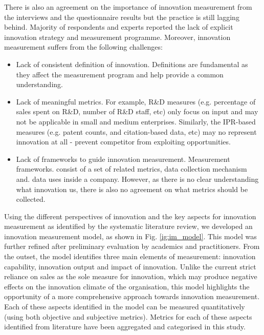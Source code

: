 \documentclass[sigplan]{acmart}
\begin{document}
There is also an agreement on the importance of innovation measurement from the interviews and the questionnaire results but the practice is still lagging behind. Majority of respondents and experts reported the lack of explicit innovation strategy and measurement programme. Moreover, innovation measurement suffers from the following challenges:
\begin{itemize}
	\item Lack of consistent definition of innovation. Definitions are fundamental as they affect the measurement program and help provide a common understanding.
	\item Lack of meaningful metrics. For example, R\&D measures (e.g. percentage of sales spent on R\&D, number of R\&D staff, etc) only focus on input and may not be applicable in small and medium enterprises. Similarly, the IPR-based measures (e.g. patent counts, and citation-based data, etc) may no represent innovation at all - prevent competitor from exploiting opportunities.
	\item Lack of frameworks to guide innovation measurement. Measurement frameworks. consist of a set of related metrics, data collection mechanism and. data uses inside a company. However, as there is no clear understanding what innovation us, there is also no agreement on what metrics should be collected.
\end{itemize}

Using the different perspectives of innovation and the key aspects for innovation measurement as identified by the systematic literature review, we developed an innovation measurement model, as shown in Fig. \ref{ig:im_model}. This model was further refined after preliminary evaluation by academics and practitioners. From the outset, the model identifies three main elements of measurement: innovation capability, innovation output and impact of innovation. Unlike the current strict reliance on sales as the sole measure for innovation, which may produce negative effects on the innovation climate of the organisation, this model highlights the opportunity of a more comprehensive approach towards innovation measurement. Each of these aspects identified in the model can be measured quantitatively (using both objective and subjective metrics). Metrics for each of these aspects identified from literature have been aggregated and categorised in this study.
\end{document}
